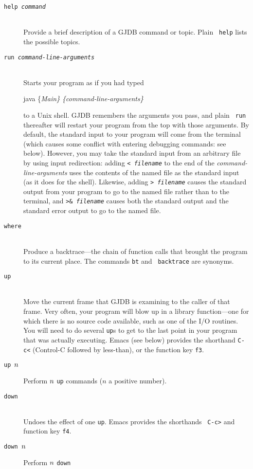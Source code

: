 \documentclass[11pt,twoside]{handout}
\begin{document}
\begin{description}
\item[\tt help {\it command}] \ \\
Provide a brief description of a GJDB command or topic.  Plain {\tt
help} lists the possible topics.
\item[\tt run {\it command-line-arguments}] \ \\
Starts your program as if you had typed
\begin{program}
java \{\it Main\} \{\it command-line-arguments\}
\end{program}
to a Unix shell.  GJDB remembers the arguments you pass, and plain {\tt
run} thereafter will restart your program from the top with those
arguments.  By default, the standard input to your program will come
from the terminal (which causes some conflict with entering debugging
commands: see below).  However, you may take the standard input from
an arbitrary file by using input redirection: adding {\tt < {\it filename\/}}
to the end of the {\it command-line-arguments\/} uses the contents of
the named file as the standard input (as it does for the shell).  
Likewise, adding {\tt> {\it filename\/}} causes the standard output
from your program to go to the named file rather than to the terminal,
and
{\tt >\& {\it filename\/}} causes both the standard output and the 
standard error output to go to the named file.
\item[\tt where] \ \\
Produce a backtrace---the chain of function calls that brought the
program to its current place.  The commands {\tt bt} and {\tt
backtrace} are synonyms.
\item[\tt up] \ \\
Move the current frame that GJDB is examining to the caller of that
frame.  Very often, your program will blow up in a library
function---one for which there is no source code available, such as
one of the I/O routines.  You will need to do several {\tt up}s to get
to the last point in your program that was actually executing.
Emacs (see below) provides the shorthand {\tt C-c<} (Control-C
followed by less-than), or the function key {\tt f3}.
\item[\tt up $n\/$] Perform $n\/$ {\tt up} commands ($n$ a positive number).
\item[\tt down] \ \\
Undoes the effect of one {\tt up}.  Emacs provides the shorthands {\tt
C-c>}
and function key {\tt f4}.
\item[\tt down $n\/$] Perform $n\/$ {\tt down} 

\end{description}
\end{document}
